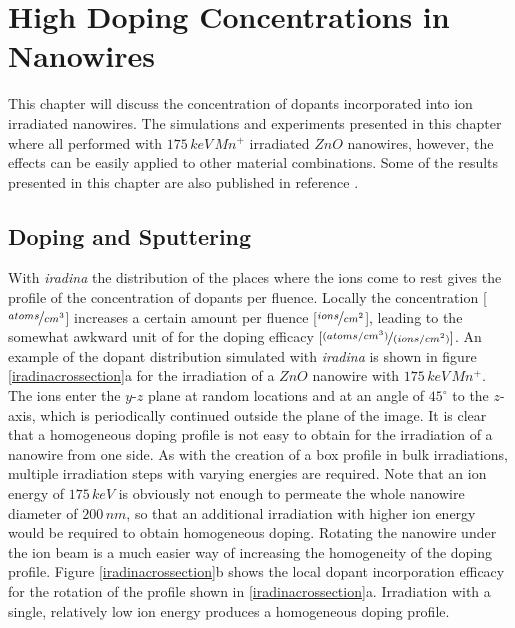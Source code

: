 \chapter{High Doping Concentrations in Nanowires}
\label{sec:high}

This chapter will discuss the concentration of dopants incorporated into ion irradiated nanowires. The simulations and experiments presented in this chapter where all performed with $175\, keV\,Mn^+$ irradiated $ZnO$ nanowires, however, the effects can be easily applied to other material combinations. Some of the results presented in this chapter are also published in reference \cite{johannes_enhanced_2014}.

\section{Doping and Sputtering}

With \emph{iradina} the distribution of the places where the ions come to rest gives the profile of the concentration of dopants per fluence. Locally the concentration [$\nicefrac{atoms}{cm^{3}}$] increases a certain amount per fluence [$\nicefrac{ions}{cm^{2}}$], leading to the somewhat awkward unit of for the doping efficacy $[\nicefrac{(atoms/cm^{3})}{(ions/cm^{2})}]$. An example of the dopant distribution simulated with \emph{iradina} is shown in figure \ref{iradinacrossection}a for the irradiation of a $ZnO$ nanowire with $175\,keV\,Mn^+$. The ions enter the $y$-$z$ plane at random locations and at an angle of $45^\circ$ to the $z$-axis, which is periodically continued outside the plane of the image. It is clear that a homogeneous doping profile is not easy to obtain for the irradiation of a nanowire from one side. As with the creation of a box profile in bulk irradiations, multiple irradiation steps with varying energies are required. Note that an ion energy of $175\,keV$ is obviously not enough to permeate the whole nanowire diameter of $200\,nm$, so that an additional irradiation with higher ion energy would be required to obtain homogeneous doping. Rotating the nanowire under the ion beam is a much easier way of increasing the homogeneity of the doping profile. Figure \ref{iradinacrossection}b shows the local dopant incorporation efficacy for the rotation of the profile shown in \ref{iradinacrossection}a. Irradiation with a single, relatively low ion energy produces a homogeneous doping profile. 
  
